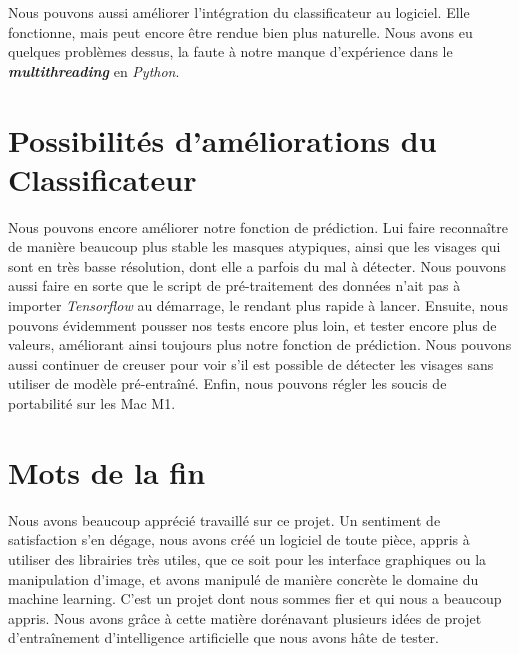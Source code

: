 \documentclass{rapport}
\begin{document}
    Nous pouvons aussi améliorer l'intégration du classificateur au logiciel. Elle fonctionne, mais peut encore être rendue bien plus naturelle. Nous avons eu quelques problèmes dessus, la faute à notre manque d'expérience dans le \textit{\textbf{multithreading}} en \textit{Python}.
    
    \section{Possibilités d'améliorations du Classificateur}
    Nous pouvons encore améliorer notre fonction de prédiction. Lui faire reconnaître de manière beaucoup plus stable les masques atypiques, ainsi que les visages qui sont en très basse résolution, dont elle a parfois du mal à détecter. Nous pouvons aussi faire en sorte que le script de pré-traitement des données n'ait pas à importer \textit{Tensorflow} au démarrage, le rendant plus rapide à lancer. 
    Ensuite, nous pouvons évidemment pousser nos tests encore plus loin, et tester encore plus de valeurs, améliorant ainsi toujours plus notre fonction de prédiction.
    Nous pouvons aussi continuer de creuser pour voir s'il est possible de détecter les visages sans utiliser de modèle pré-entraîné.
    Enfin, nous pouvons régler les soucis de portabilité sur les Mac M1.
    
    \section{Mots de la fin}
    Nous avons beaucoup apprécié travaillé sur ce projet. Un sentiment de satisfaction s'en dégage, nous avons créé un logiciel de toute pièce, appris à utiliser des librairies très utiles, que ce soit pour les interface graphiques ou la manipulation d'image, et avons manipulé de manière concrète le domaine du machine learning. C'est un projet dont nous sommes fier et qui nous a beaucoup appris. Nous avons grâce à cette matière dorénavant plusieurs idées de projet d'entraînement d'intelligence artificielle que nous avons hâte de tester.
    
\newpage
\printbibliography{}
    
\end{document}
